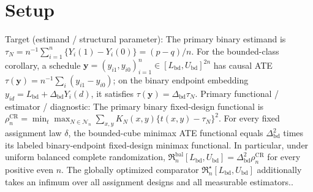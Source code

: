 \documentclass{article}
\begin{document}
\section{Setup}

Target (estimand / structural parameter): The primary binary estimand is \(\tau_N=n^{-1}\sum_{i=1}^n\{Y_i(1)-Y_i(0)\}=(p-q)/n\). For the bounded-class corollary, a schedule \(\mathbf y=(y_{i1},y_{i0})_{i=1}^n\in[L_{\mathrm{bd}},U_{\mathrm{bd}}]^{2n}\) has causal ATE \(\tau(\mathbf y)=n^{-1}\sum_i(y_{i1}-y_{i0})\); on the binary endpoint embedding \(y_{id}=L_{\mathrm{bd}}+\Delta_{\mathrm{bd}}Y_i(d)\), it satisfies \(\tau(\mathbf y)=\Delta_{\mathrm{bd}}\tau_N\).
Primary functional / estimator / diagnostic: The primary binary fixed-design functional is \(\rho_n^{\mathrm{CR}}=\min_t\max_{N\in\mathcal N_n}\sum_{x,y}K_N(x,y)\{t(x,y)-\tau_N\}^2\). For every fixed assignment law \(\delta\), the bounded-cube minimax ATE functional equals \(\Delta_{\mathrm{bd}}^2\) times its labeled binary-endpoint fixed-design minimax functional. In particular, under uniform balanced complete randomization, \(\mathfrak R_n^{\mathrm{bal}}[L_{\mathrm{bd}},U_{\mathrm{bd}}]=\Delta_{\mathrm{bd}}^2\rho_n^{\mathrm{CR}}\) for every positive even \(n\). The globally optimized comparator \(\mathfrak R_n^\star[L_{\mathrm{bd}},U_{\mathrm{bd}}]\) additionally takes an infimum over all assignment designs and all measurable estimators..
\end{document}
